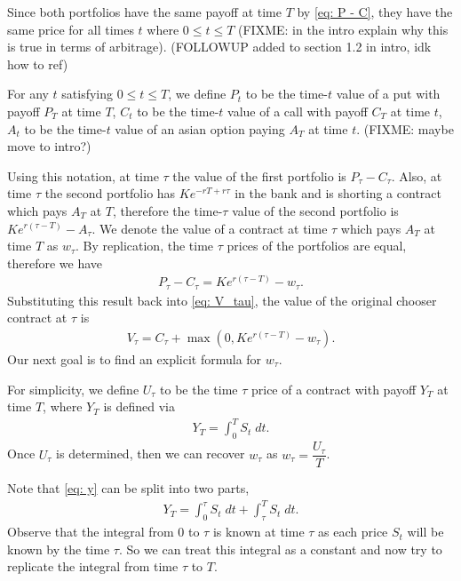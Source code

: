 \documentclass[reqno]{amsart}
\begin{document}
Since both portfolios have the same payoff at time $T$ by \eqref{eq: P - C}, they have the same price for all times $t$ where $0 \leq t \leq T$ (FIXME: in the intro explain why this is true in terms of arbitrage). (FOLLOWUP added to section 1.2 in intro, idk how to ref)

For any $t$ satisfying $0 \le t \le T$, we define $P_t$ to be the time-$t$ value of a put with payoff $P_T$ at time $T$, $C_t$ to be the time-$t$ value of a call with payoff $C_T$ at time $t$, $A_t$ to be the time-$t$ value of an asian option paying $A_T$ at time $t$. (FIXME: maybe move to intro?)

Using this notation, at time $\tau$ the value of the first portfolio is $P_\tau - C_\tau$. Also, at time $\tau$ the second portfolio has $Ke^{-rT + r\tau}$ in the bank and is shorting a contract which pays $A_T$ at $T$, therefore the time-$\tau$ value of the second portfolio is $Ke^{r(\tau - T)} - A_\tau$. We denote the value of a contract at time $\tau$ which pays $A_T$ at time $T$ as $w_\tau$.
By replication, the time $\tau$ prices of the portfolios are equal, therefore we have 
\begin{align}\label{eq: P-C Parity}
     P_\tau - C_\tau = Ke^{r(\tau - T)} - w_\tau.
\end{align}
Substituting this result back into \eqref{eq: V_tau}, the value of the original chooser contract at $\tau$ is
\begin{align}
     V_\tau = C_\tau + \max(0, Ke^{r(\tau - T)} - w_\tau).
\end{align}
Our next goal is to find an explicit formula for $w_\tau$. 

For simplicity, we define $U_\tau$ to be the time $\tau$ price of a contract with payoff $Y_T$ at time $T$, where $Y_T$ is defined via
\begin{align}\label{eq: y}
     Y_T = \int_0^T S_t \; dt.
\end{align}
Once $U_\tau$ is determined, then we can recover $w_\tau$ as $w_\tau = \dfrac{U_\tau}{T}$. 

Note that \eqref{eq: y} can be split into
two parts, 
\begin{align}
     Y_T = \int_0^\tau S_t \; dt + \int_\tau^T S_t \; dt.
\end{align}
Observe that the integral from $0$ to $\tau$ is known at time $\tau$ as each price $S_t$ will be known by the time $\tau$. So we can treat this integral as a constant and now try to replicate the integral from time $\tau$ to $T$.
\end{document}
